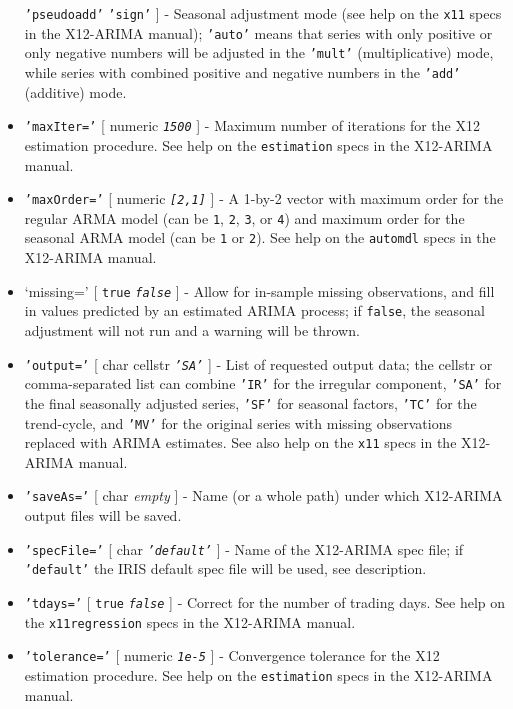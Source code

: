 \begin{itemize}
   \texttt{'pseudoadd'} \textbar{} \texttt{'sign'} {]} - Seasonal
   adjustment mode (see help on the \texttt{x11} specs in the X12-ARIMA
   manual); \texttt{'auto'} means that series with only positive or only
   negative numbers will be adjusted in the \texttt{'mult'}
   (multiplicative) mode, while series with combined positive and
   negative numbers in the \texttt{'add'} (additive) mode.
 \item
   \texttt{'maxIter='} {[} numeric \textbar{} \emph{\texttt{1500}} {]} -
   Maximum number of iterations for the X12 estimation procedure. See
   help on the \texttt{estimation} specs in the X12-ARIMA manual.
 \item
   \texttt{'maxOrder='} {[} numeric \textbar{} \emph{\texttt{{[}2,1{]}}}
   {]} - A 1-by-2 vector with maximum order for the regular ARMA model
   (can be \texttt{1}, \texttt{2}, \texttt{3}, or \texttt{4}) and maximum
   order for the seasonal ARMA model (can be \texttt{1} or \texttt{2}).
   See help on the \texttt{automdl} specs in the X12-ARIMA manual.
 \item
   `missing=' {[} \texttt{true} \textbar{} \emph{\texttt{false}} {]} -
   Allow for in-sample missing observations, and fill in values predicted
   by an estimated ARIMA process; if \texttt{false}, the seasonal
   adjustment will not run and a warning will be thrown.
 \item
   \texttt{'output='} {[} char \textbar{} cellstr \textbar{}
   \emph{\texttt{'SA'}} {]} - List of requested output data; the cellstr
   or comma-separated list can combine \texttt{'IR'} for the irregular
   component, \texttt{'SA'} for the final seasonally adjusted series,
   \texttt{'SF'} for seasonal factors, \texttt{'TC'} for the trend-cycle,
   and \texttt{'MV'} for the original series with missing observations
   replaced with ARIMA estimates. See also help on the \texttt{x11} specs
   in the X12-ARIMA manual.
 \item
   \texttt{'saveAs='} {[} char \textbar{} \emph{empty} {]} - Name (or a
   whole path) under which X12-ARIMA output files will be saved.
 \item
   \texttt{'specFile='} {[} char \textbar{} \emph{\texttt{'default'}} {]}
   - Name of the X12-ARIMA spec file; if \texttt{'default'} the IRIS
   default spec file will be used, see description.
 \item
   \texttt{'tdays='} {[} \texttt{true} \textbar{} \emph{\texttt{false}}
   {]} - Correct for the number of trading days. See help on the
   \texttt{x11regression} specs in the X12-ARIMA manual.
 \item
   \texttt{'tolerance='} {[} numeric \textbar{} \emph{\texttt{1e-5}} {]}
   - Convergence tolerance for the X12 estimation procedure. See help on
   the \texttt{estimation} specs in the X12-ARIMA manual.
 \end{itemize}
 
